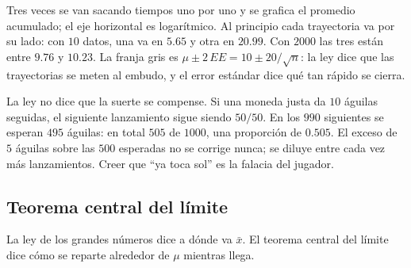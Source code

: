 \documentclass[11pt,letterpaper]{article}
\begin{document}
\begin{center}
\end{center}

Tres veces se van sacando tiempos uno por uno y se grafica el promedio
acumulado; el eje horizontal es logarítmico. Al principio cada
trayectoria va por su lado: con $10$ datos, una va en $5.65$ y otra en
$20.99$. Con $2000$ las tres están entre $9.76$ y $10.23$. La franja
gris es $\mu \pm 2\,EE = 10 \pm 20 / \sqrt{n}$: la ley dice que las
trayectorias se meten al embudo, y el error estándar dice qué tan
rápido se cierra.

\begin{ojo}
    La ley no dice que la suerte se compense. Si una moneda justa da
    $10$ águilas seguidas, el siguiente lanzamiento sigue siendo
    $50/50$. En los $990$ siguientes se esperan $495$ águilas: en total
    $505$ de $1000$, una proporción de $0.505$. El exceso de $5$
    águilas sobre las $500$ esperadas no se corrige nunca; se diluye
    entre cada vez más lanzamientos. Creer que ``ya toca sol'' es la
    falacia del jugador.
\end{ojo}


\subsection*{Teorema central del límite}

La ley de los grandes números dice a dónde va $\bar{x}$. El teorema
central del límite dice cómo se reparte alrededor de $\mu$ mientras
llega.
\end{document}
